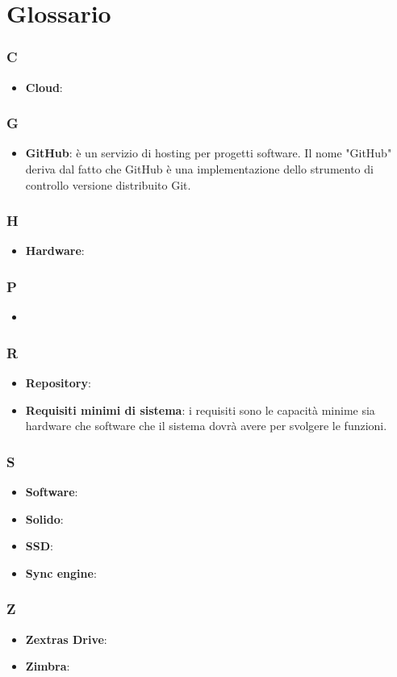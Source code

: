 \appendix

\section{Glossario}

\subsubsection{C}
\begin{itemize}
	\item \textbf{Cloud}:
\end{itemize}
\subsubsection{G}
\begin{itemize}
	\item \textbf{GitHub}: è un servizio di hosting per progetti software. Il nome "GitHub" deriva dal fatto che
GitHub è una implementazione dello strumento di controllo versione distribuito Git.
\end{itemize}
\subsubsection{H}
\begin{itemize}
	\item \textbf{Hardware}:
\end{itemize}

\subsubsection{P}
\begin{itemize}
	\item 
\end{itemize}

\subsubsection{R}
\begin{itemize}
	\item \textbf{Repository}:
	\item \textbf{Requisiti minimi di sistema}: i requisiti sono le capacità minime sia hardware che software che il sistema dovrà avere per svolgere le funzioni.
\end{itemize}

\subsubsection{S}
\begin{itemize}
	\item \textbf{Software}: 
	\item \textbf{Solido}:
	\item \textbf{SSD}:
	\item \textbf{Sync engine}:
\end{itemize}

\subsubsection{Z}
\begin{itemize}
	\item \textbf{Zextras Drive}:
	\item \textbf{Zimbra}:
\end{itemize}